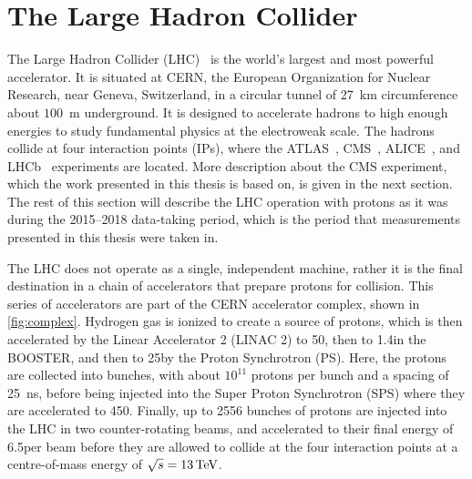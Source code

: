 \section{The Large Hadron Collider}\label{sec:lhc}
The Large Hadron Collider (LHC)~\cite{Evans:2008zzb} is the world's largest and most powerful accelerator. It is situated at CERN, the European Organization for Nuclear Research, near Geneva, Switzerland, in a circular tunnel of 27~\unit{km} circumference about $100$~\unit{m} underground. It is designed to accelerate hadrons to high enough energies to study fundamental physics at the electroweak scale. The hadrons collide at four interaction points (IPs), where the ATLAS~\cite{ATLAS:2008xda}, CMS~\cite{CMS:2008xjf}, ALICE~\cite{ALICE:2008ngc}, and LHCb~\cite{LHCb:2008vvz} experiments are located. More description about the CMS experiment, which the work presented in this thesis is based on, is given in the next section. The rest of this section will describe the LHC operation with protons as it was during the 2015--2018 data-taking period, which is the period that measurements presented in this thesis were taken in.

The LHC does not operate as a single, independent machine, rather it is the final destination in a chain of accelerators that prepare protons for collision. This series of accelerators are part of the CERN accelerator complex, shown in \cref{fig:complex}. Hydrogen gas is ionized to create a source of protons, which is then accelerated by the Linear Accelerator 2 (LINAC 2) to 50\MeV, then to 1.4\GeV in the BOOSTER, and then to 25\GeV by the Proton Synchrotron (PS). Here, the protons are collected into bunches, with about $10^{11}$ protons per bunch and a spacing of 25~\unit{ns}, before being injected into the Super Proton Synchrotron (SPS) where they are accelerated to 450\GeV. Finally, up to 2556 bunches of protons are injected into the LHC in two counter-rotating beams, and accelerated to their final energy of 6.5\TeV per beam before they are allowed to collide at the four interaction points at a centre-of-mass energy of $\sqrt{s} = 13\,\text{Te\hspace{-.08em}V}$.

